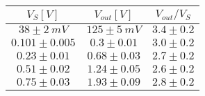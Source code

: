 \begin{tabular}{ccc}
\hline
	$V_S[V]$ & $V_{out}[V]$ & $V_{out}/V_S$\\ 
\hline
	$38\pm2\ mV$ & $125\pm5\ mV$ & $3.4\pm0.2$ \\
	$0.101\pm0.005$ & $0.3\pm0.01$ & $3.0\pm0.2$ \\
	$0.23\pm0.01$ & $0.68\pm0.03$ & $2.7\pm0.2$ \\
	$0.51\pm0.02$ & $1.24\pm0.05$ & $2.6\pm0.2$ \\
	$0.75\pm0.03$ & $1.93\pm0.09$ & $2.8\pm0.2$ \\
\hline
\end{tabular}
